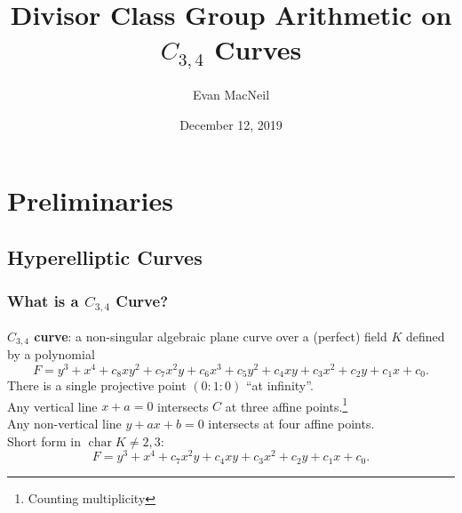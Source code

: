 \documentclass{beamer}
\title[$C_{3,4}$ Arithmetic]{Divisor Class Group Arithmetic on $C_{3,4}$ Curves} %
\author{Evan MacNeil} %
\institute[UofC] %
{
University of Calgary \\ %
\medskip
\textit{macneil.evan@ucalgary.ca} %
}
\date{December 12, 2019} %
\newcommand{\defn}{\textbf}
\DeclareMathOperator{\Char}{char}
\begin{document}
\begin{frame}
\titlepage %
\end{frame}



\section{Preliminaries} 

\subsection{Hyperelliptic Curves} 

\begin{frame}
\frametitle{What is a $C_{3,4}$ Curve?}
\defn{$C_{3,4}$ curve}: a non-singular algebraic plane curve over a (perfect) field $K$ defined by a polynomial
	\[ F = y^3 + x^4 + c_8xy^2 + c_7x^2y + c_6x^3 + c_5y^2 + c_4xy + c_3x^2 + c_2y + c_1x + c_0. \]
There is a single projective point $(0 : 1 : 0)$ ``at infinity''.\\
Any vertical line $x + a = 0$ intersects $C$ at three affine points.\footnote{Counting multiplicity} \\
Any non-vertical line $y + ax + b = 0$ intersects at four affine points. \\
\vspace{10pt}
Short form in $\Char K \neq 2,3$:
  \[ F = y^3 + x^4 + c_7x^2y + c_4xy + c_3x^2 + c_2y + c_1x + c_0. \]
\end{frame}
\end{document}
